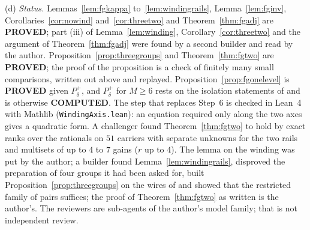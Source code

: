 \begin{remark}
(d) \emph{Status.} Lemmas~\ref{lem:fgkappa} to~\ref{lem:windingrails}, Lemma~\ref{lem:fginv}, Corollaries~\ref{cor:nowind} and~\ref{cor:threetwo} and Theorem~\ref{thm:fgadj} are \textbf{PROVED}; part (iii) of Lemma~\ref{lem:winding}, Corollary~\ref{cor:threetwo} and the argument of Theorem~\ref{thm:fgadj} were found by a second builder and read by the author. Proposition~\ref{prop:threegroups} and Theorem~\ref{thm:fgtwo} are \textbf{PROVED}; the proof of the proposition is a check of finitely many small comparisons, written out above and replayed. Proposition~\ref{prop:fgonelevel} is \textbf{PROVED} given $P^{+}_\delta$, and $P^{+}_\delta$ for $M\ge6$ rests on the isolation statements of \cite{dgone} and is otherwise \textbf{COMPUTED}. The step that replaces Step~6 is checked in Lean~4 with Mathlib (\texttt{WindingAxis.lean}): an equation required only along the two axes gives a quadratic form. A challenger found Theorem~\ref{thm:fgtwo} to hold by exact ranks over the rationals on $51$ carriers with separate unknowns for the two rails and multisets of up to $4$ to $7$ gains ($r$ up to $4$). The lemma on the winding was put by the author; a builder found Lemma~\ref{lem:windingrails}, disproved the preparation of four groups it had been asked for, built Proposition~\ref{prop:threegroups} on the wires of \cite{dgone} and showed that the restricted family of pairs suffices; the proof of Theorem~\ref{thm:fgtwo} as written is the author's. The reviewers are sub-agents of the author's model family; that is not independent review.
\end{remark}
